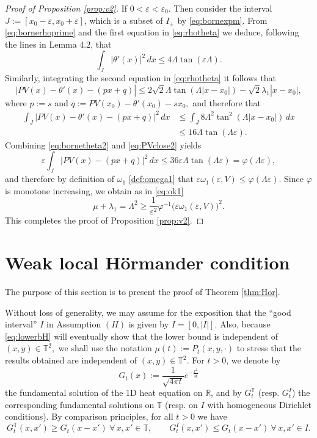 \documentclass[12pt]{article}
\newcommand{\R}{\mathbb{R}}
\newcommand{\T}{\mathbb{T}}
\newcommand{\eps}{\varepsilon}
\begin{document}
\begin{proof}[Proof of Proposition \ref{prop:v2}]
 If $0 < \eps < \eps_0.$ Then 
consider the interval $J := [x_0-\eps, x_0 +\eps]$, which is a subset 
of $I_\pm$ by \eqref{eq:bornexpm}. 
From \eqref{eq:bornerhoprime} and the first equation in \eqref{eq:rhotheta} 
we deduce, following the lines in \cite{Wei21} Lemma 4.2, that 
\begin{equation}\label{eq:bornetheta2}
\int_J|\theta'(x)|^2\, dx \leq 
4\Lambda\tan(\eps \Lambda).
\end{equation}
Similarly, integrating the second equation in \eqref{eq:rhotheta} it follows 
that
\begin{equation}\label{eq:PVclose1}
\big| PV(x) - \theta'(x) -(px + q)| \leq 2\sqrt{2}\Lambda\tan(\Lambda|x-x_0|) -
\sqrt{2}\lambda_1 |x-x_0|,
\end{equation} 
where $p := s$ and $q := PV(x_0) - \theta'(x_0) - sx_0,$ and therefore that 
\begin{equation}\label{eq:PVclose2}\begin{split}
\int_J \big| PV(x) - \theta'(x) -(px + q)|^2 \,dx &\leq
\int_J 8\Lambda^2\tan^2(\Lambda|x-x_0|) \, dx\\
&\leq 16\Lambda\tan(\Lambda\eps).
\end{split}\end{equation}
Combining \eqref{eq:bornetheta2} and \eqref{eq:PVclose2} yields
$$
\eps \int_J |PV(x) - (px+q)|^2\,dx \leq 36\eps\Lambda\tan(\Lambda\eps) =
\varphi(\Lambda \eps),
$$
and therefore by definition of $\omega_1$ \eqref{def:omega1} that $\eps \omega_1(\eps, V) \leq
\varphi(\Lambda \eps)$. Since $\varphi$ is monotone increasing, we obtain 
as in \eqref{eq:ok1}
$$
\mu + \lambda_1 = \Lambda^2 \geq \frac{1}{\eps^2} \varphi^{-1}\big(\eps
\omega_1(\eps, V)\big)^2.
$$
This completes the proof of Proposition \ref{prop:v2}.
\end{proof}

\section{Weak local H\"ormander condition}\label{sect:Hor}

The purpose of this section is to present the proof of Theorem \ref{thm:Hor}.

\medskip

Without loss of generality, we may assume for the exposition that the ``good interval'' $I$ 
in Assumption $(H)$ is given by $I = [0,|I|]$.  
Also, because \eqref{eq:lowerbH} will eventually show that the lower bound is 
independent of $(x,y) \in \T^2,$ we shall use the notation 
$\mu(t) := P_t(x,y,\cdot)$ to stress that the results obtained are independent 
of $(x,y) \in \T^2.$ For $t > 0$, we denote by 
$$
G_t(x) := \frac{1}{\sqrt{4\pi t}} e^{-\frac{x^2}{4t}}
$$
the fundamental solution of the 1D heat equation on $\R$, and by 
$G_t^\T$ (resp. $G_t^I$) the corresponding fundamental solutions on
$\T$ (resp. on $I$ with homogeneous Dirichlet conditions).
By comparison principles, for all $t>0$ we have
\begin{equation}\label{eq:compgreen}
G_t^\T(x,x') \geq G_t(x-x') \ \forall\, x,x' \in \T, \qquad
G_t^I(x,x') \leq G_t(x-x') \ \forall\, x,x' \in I.
\end{equation}
\end{document}
